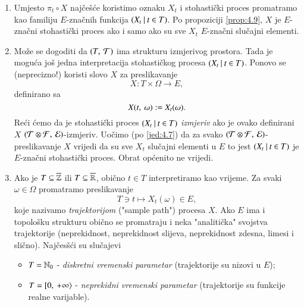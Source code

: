 \begin{nap} \label{nap:8.2}
    \begin{enumerate}[label=(\alph*)]
        \item Umjesto $\pi_t \circ X$ naj\v ce\v s\' ce koristimo oznaku $X_t$ i stohasti\v cki proces promatramo kao familiju $E$-zna\v cnih funkcija $({X_t} \: | \: {t \in T})$.
        Po propoziciji \ref{prop:4.9}, $X$ je $E$-zna\v cni stohasti\v cki proces ako i samo ako su sve $X_t$ $E$-zna\v cni slu\v cajni elementi.
        \item Mo\v ze se dogoditi da $({T}, \: {\mathcal{T}})$ ima strukturu izmjerivog prostora.
        Tada je mogu\' ca jo\v s jedna interpretacija stohasti\v ckog procesa $({X_t} \: | \: {t \in T})$.
        Ponovo se (neprecizno!) koristi slovo $X$ za preslikavanje
        \begin{equation*}
            X : T \times \Omega \to E,
        \end{equation*}
        definirano sa
        \begin{equation*}
            X ({t}, \: {\omega}) := X_t (\omega).
        \end{equation*}
        Re\' ci \' cemo da je stohasti\v cki proces $({X_t} \: | \: {t \in T})$ \emph{izmjeriv} ako je ovako definirani $X$ $({\mathcal{T} \otimes \mathcal{F}}, \: {\mathcal{E}})$-izmjeriv.
        Uo\v cimo (po \eqref{jed:4.7}) da za svako $({\mathcal{T} \otimes \mathcal{F}}, \: {\mathcal{E}})$-preslikavanje $X$ vrijedi da su sve $X_t$ slu\v cajni elementi u $E$ to jest $({X_t} \: | \: {t \in T})$ je $E$-zna\v cni stohasti\v cki proces.
        Obrat op\' cenito ne vrijedi.
        \item Ako je $T \subseteq \overline{\mathbb{Z}}$ ili $T \subseteq \overline{\mathbb{R}}$, obi\v cno $t \in T$ interpretiramo kao vrijeme.
        Za svaki $\omega \in \Omega$ promatramo preslikavanje
        \begin{equation*}
            T \ni t \mapsto X_t (\omega) \in E,
        \end{equation*}
        koje nazivamo \emph{trajektorijom} ("sample path") procesa $X$.
        Ako $E$ ima i topolo\v sku strukturu obi\v cno se promatraju i neka "analiti\v cka" svojstva trajektorije (neprekidnost, neprekidnost slijeva, neprekidnost zdesna, limesi i sli\v cno).
        Naj\v ces\v s\' ci su slu\v cajevi
        \begin{itemize}
            \item $T = \mathbb{N}_0$ - \emph{diskretni vremenski parametar} (trajektorije su nizovi u $E$);
            \item $T = [ {0}, \: {+\infty} \rangle$ - \emph{neprekidni vremenski parametar} (trajektorije su funkcije realne varijable).

\end{itemize}
\end{enumerate}
\end{nap}
